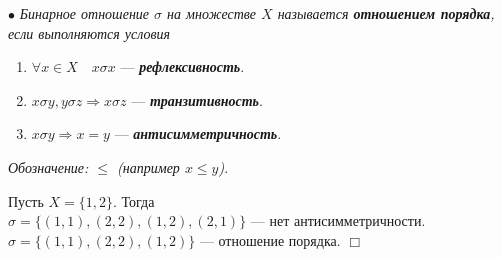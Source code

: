 \documentclass[a4paper, 12pt]{report}
\newenvironment{examp} %
{\par\noindent{\textbf{\textsc{Пример:}}}} %
{\hfill$\scriptstyle\Box$}
\begin{document}
	$\bullet$ \textit{Бинарное отношение $\sigma$ на множестве $X$ называется \textbf{отношением порядка}, если выполняются условия}\begin{enumerate}
		\item $\forall x\in X\quad x\sigma x$ --- \textit{\textbf{рефлексивность}}.
		\item $x \sigma y, y\sigma z\Rightarrow x \sigma z$ --- \textit{\textbf{транзитивность}}.
		\item $x \sigma y\Rightarrow x = y$ --- \textbf{\textit{антисимметричность}}.
	\end{enumerate}
	\textit{Обозначение: $\leqslant$ (например $x\leqslant y$)}.\\
\begin{examp}
		Пусть $X = \{1,2\}$. Тогда\\
	$\sigma = \{ (1,1), (2,2), (1,2), (2,1)\}$ --- нет антисимметричности.\\
	$\sigma = \{(1,1), (2,2), (1,2)\}$ --- отношение порядка.
\end{examp}
	
	
	
	
	
\end{document}
